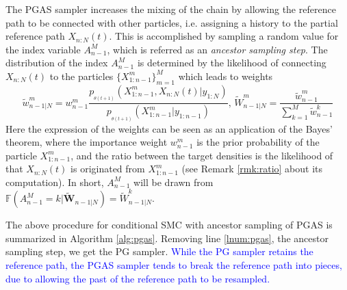 \documentclass[12pt]{article}
\begin{document}
The PGAS sampler increases the mixing of the chain by allowing the reference path to be connected with other particles, i.e. assigning a history to the partial reference path $X_{n:N}(t)$. This is accomplished by sampling a random value for the index variable $A^M_{n-1}$, which is referred as an \emph{ancestor sampling step}. The distribution of the index $A^M_{n-1}$ is determined by the likelihood of connecting $X_{n:N}(t)$ to the particles $\{X_{1:n-1}^m\}_{m=1}^M$ which leads to weights
\begin{equation}\label{eq:aswt}
\widetilde{w}_{n-1 |N}^m = w_{n-1}^m \frac{p_{_{\theta(t+1)}}(X^m_{1:n-1}, X_{n:N}(t)| y_{1:N})}{p_{_{\theta(t+1)}}(X^m_{1:n-1}| y_{1:n-1})}, \, \widetilde{W}_{n-1|N}^m = \frac{\widetilde{w}_{n-1}^m}{\sum_{k=1}^M \widetilde{w}_{n-1}^k}
\end{equation}
Here the expression of the weights can be seen as an application of the Bayes' theorem, where the importance weight $w_{n-1}^m$ is the prior probability of the particle $X_{1:n-1}^m$, and the ratio between the target densities is the likelihood of that $X_{n:N}(t)$ is originated from $X_{1:n-1}^m$ (see Remark \ref{rmk:ratio} about its computation).  
In short, $A^M_{n-1}$ will be drawn from $\mathbb{F}(A^M_{n-1}=k | \widetilde{\mathbf{W}}_{n-1|N}) = \widetilde{W}_{n-1|N}^k$. 

The above procedure for conditional SMC with ancestor sampling of PGAS  is summarized in Algorithm \ref{alg:pgas}. Removing line \ref{lnum:pgas}, the ancestor sampling step, we get the PG sampler. \textcolor{blue}{While the PG sampler retains the reference path, the PGAS sampler tends to break the reference path into pieces, due to allowing the past of the reference path to be resampled. }
\end{document}
